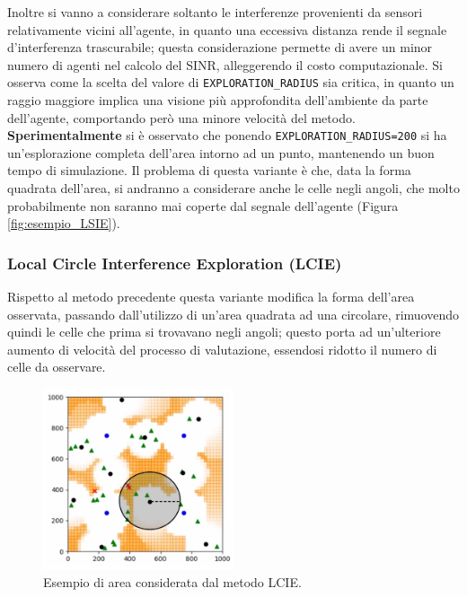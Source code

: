 Inoltre si vanno a considerare soltanto le interferenze provenienti da sensori relativamente vicini all'agente, in quanto una eccessiva distanza rende il segnale d'interferenza trascurabile; questa considerazione permette di avere un minor numero di agenti nel calcolo del SINR, alleggerendo il costo computazionale.
Si osserva come la scelta del valore di \texttt{EXPLORATION\_RADIUS} sia critica, in quanto  un raggio maggiore implica una visione più approfondita dell'ambiente da parte dell'agente, comportando però una minore velocità del metodo.
\textbf{Sperimentalmente} si è osservato che ponendo \texttt{EXPLORATION\_RADIUS=200} si ha un'esplorazione completa dell'area intorno ad un punto, mantenendo un buon tempo di simulazione.
Il problema di questa variante è che, data la forma quadrata dell'area, si andranno a considerare anche le celle negli angoli, che molto probabilmente non saranno mai coperte dal segnale dell'agente (Figura \ref{fig:esempio_LSIE}).


\subsubsection{Local Circle Interference Exploration (LCIE)}
Rispetto al metodo precedente questa variante modifica la forma dell'area osservata, passando dall'utilizzo di un'area quadrata ad una circolare, rimuovendo quindi le celle che prima si trovavano negli angoli; questo porta ad un'ulteriore aumento di velocità del processo di valutazione, essendosi ridotto il numero di celle da osservare.
\begin{figure}[h]
    \centering
    \includegraphics[width=0.5\textwidth]{img/ch3/esempio_LCIE.jpg}
    \caption[Esempio dell'area valutata con il metodo LCIE]{Esempio di area considerata dal metodo LCIE.}
    \label{fig:esempio_LCIE}
\end{figure}

